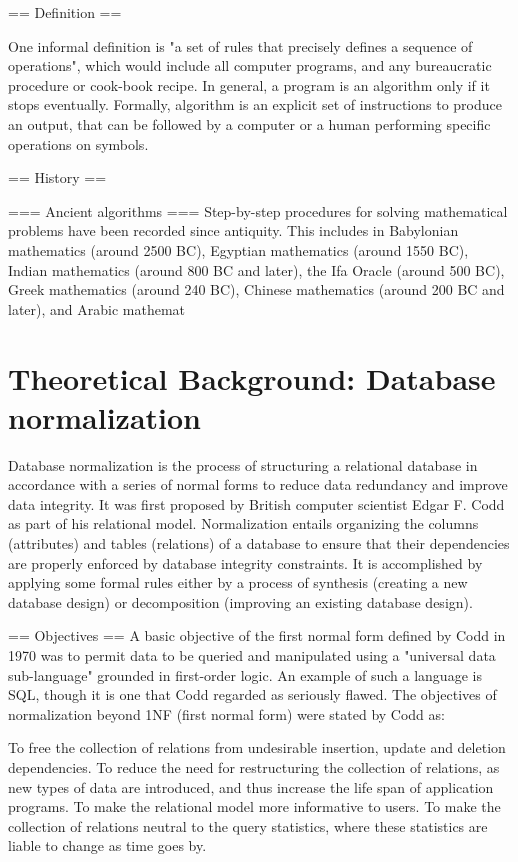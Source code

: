 \documentclass[12pt,a4paper]{report}
\begin{document}
== Definition ==

One informal definition is "a set of rules that precisely defines a sequence of operations", which would include all computer programs, and any bureaucratic procedure
or cook-book recipe. In general, a program is an algorithm only if it stops eventually. Formally, algorithm is an explicit set of instructions to produce an output, that can be followed by a computer or a human performing specific operations on symbols.


== History ==


=== Ancient algorithms ===
Step-by-step procedures for solving mathematical problems have been recorded since antiquity. This includes in Babylonian mathematics (around 2500 BC), Egyptian mathematics (around 1550 BC), Indian mathematics (around 800 BC and later), the Ifa Oracle (around 500 BC), Greek mathematics (around 240 BC), Chinese mathematics (around 200 BC and later), and Arabic mathemat

\section{Theoretical Background: Database normalization}
Database normalization is the process of structuring a relational database in accordance with a series of normal forms to reduce data redundancy and improve data integrity. It was first proposed by British computer scientist Edgar F. Codd as part of his relational model.
Normalization entails organizing the columns (attributes) and tables (relations) of a database to ensure that their dependencies are properly enforced by database integrity constraints. It is accomplished by applying some formal rules either by a process of synthesis (creating a new database design) or decomposition (improving an existing database design).


== Objectives ==
A basic objective of the first normal form defined by Codd in 1970 was to permit data to be queried and manipulated using a "universal data sub-language" grounded in first-order logic. An example of such a language is SQL, though it is one that Codd regarded as seriously flawed.
The objectives of normalization beyond 1NF (first normal form) were stated by Codd as:

To free the collection of relations from undesirable insertion, update and deletion dependencies.
To reduce the need for restructuring the collection of relations, as new types of data are introduced, and thus increase the life span of application programs.
To make the relational model more informative to users.
To make the collection of relations neutral to the query statistics, where these statistics are liable to change as time goes by.
\end{document}
